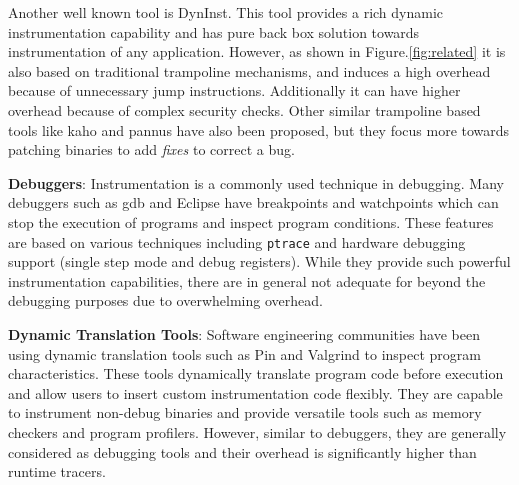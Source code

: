 Another well known tool is DynInst\cite{dyninst}. This tool provides a rich dynamic instrumentation capability and has pure back box solution towards instrumentation of any application.
However, as shown in Figure.\ref{fig:related} it is also based on traditional trampoline mechanisms, and induces a high overhead because of unnecessary jump instructions.
Additionally it can have higher overhead because of complex security checks. 
Other similar trampoline based tools like kaho and pannus\cite{pannus,kaho} have also been proposed, but they focus more towards patching binaries to add \emph{fixes} to correct a bug.


\noindent \textbf{Debuggers}: \quad
Instrumentation is a commonly used technique in debugging. Many debuggers such as gdb \cite{gdb} and Eclipse have breakpoints and watchpoints which can stop the execution of programs and inspect program conditions. These features are based on various techniques including \texttt{ptrace} and hardware debugging support (single step mode and debug registers). While they provide such powerful instrumentation capabilities, there are in general not adequate for beyond the debugging purposes due to overwhelming overhead.

\noindent \textbf{Dynamic Translation Tools}: \quad
Software engineering communities have been using dynamic translation tools such as Pin \cite{pin} and Valgrind \cite{valgrind} to inspect program characteristics. 
These tools dynamically translate program code before execution and allow users to insert custom instrumentation code flexibly. They are capable to instrument non-debug binaries and provide versatile tools such as memory checkers and program profilers. However, similar to debuggers, they are generally considered as debugging tools and their overhead is significantly higher than runtime tracers.


